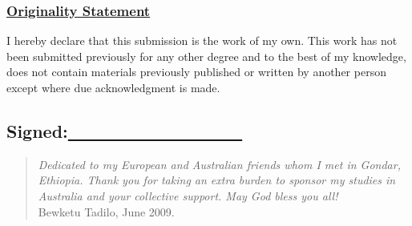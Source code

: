 \documentclass[11pt,left=2cm,bottom=2cm,oneside]{book}
\begin{document}
\subsubsection*{\underline{Originality Statement}}
I hereby declare that this submission is the work of my own. This work has not been submitted previously for any other degree and to the best of my knowledge, does not contain materials previously published or written by another person except where due acknowledgment is made.
\subsection*{Signed:\underline{~~~~~~~~~~~~~~~~~~}}
\clearpage
\vspace*{5pt}
\begin{minipage}{15cm}
\raggedright
\begin{quote}
\textit{
Dedicated to my European and Australian friends whom I met in Gondar,
Ethiopia. Thank you for taking an extra burden to sponsor my studies in Australia
and your collective support. May God bless you all!}\\
\raggedleft
\-\-Bewketu Tadilo, June 2009.
\end{quote}
\end{minipage}
\clearpage
\tableofcontents{}
\listoffigures{}
\listoftables{}
\end{document}
